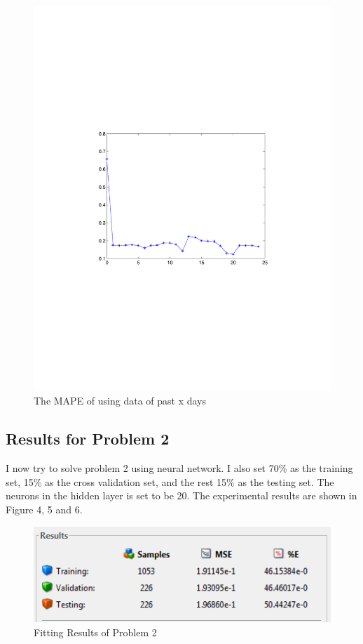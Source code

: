 \documentclass{sig-alternate}
\begin{document}
\begin{figure}[ht]
\centering
\includegraphics[scale = 0.4, trim = 350 250 350 250]{pic/lg.pdf}
\caption{The MAPE of using data of past x days}
\end{figure}





\subsection{Results for Problem 2}
I now try to solve problem 2 using neural network. I also set 70\% as the training set, 15\% as the cross validation set, and the rest 15\% as the testing set. The neurons in the hidden layer is set to be 20. The experimental results are shown in Figure 4, 5 and 6.
\begin{figure}[ht]
\centering
\includegraphics[scale = 0.7]{pic/cl3.png}
\caption{Fitting Results of Problem 2}
\end{figure}
\end{document}
